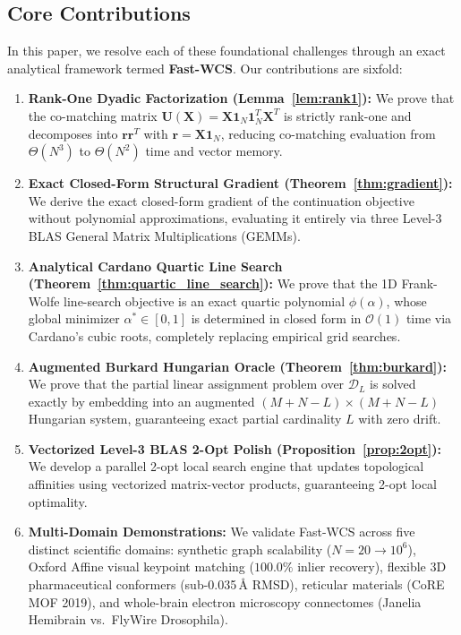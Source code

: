 \documentclass[a4paper,fleqn]{cas-dc}
\theoremstyle{thmstyleone}
\theoremstyle{thmstyletwo}
\theoremstyle{thmstylethree}
\begin{document}
\subsection{Core Contributions}
In this paper, we resolve each of these foundational challenges through an exact analytical framework termed \textbf{Fast-WCS}. Our contributions are sixfold:
\begin{enumerate}
    \item \textbf{Rank-One Dyadic Factorization (Lemma~\ref{lem:rank1}):} We prove that the co-matching matrix $\mathbf{U}(\mathbf{X}) = \mathbf{X}\mathbf{1}_N\mathbf{1}_N^T\mathbf{X}^T$ is strictly rank-one and decomposes into $\mathbf{r}\mathbf{r}^T$ with $\mathbf{r} = \mathbf{X}\mathbf{1}_N$, reducing co-matching evaluation from $\Theta(N^3)$ to $\Theta(N^2)$ time and vector memory.
    \item \textbf{Exact Closed-Form Structural Gradient (Theorem~\ref{thm:gradient}):} We derive the exact closed-form gradient of the continuation objective without polynomial approximations, evaluating it entirely via three Level-3 BLAS General Matrix Multiplications (GEMMs).
    \item \textbf{Analytical Cardano Quartic Line Search (Theorem~\ref{thm:quartic_line_search}):} We prove that the 1D Frank-Wolfe line-search objective is an exact quartic polynomial $\phi(\alpha)$, whose global minimizer $\alpha^* \in [0, 1]$ is determined in closed form in $\mathcal{O}(1)$ time via Cardano's cubic roots, completely replacing empirical grid searches.
    \item \textbf{Augmented Burkard Hungarian Oracle (Theorem~\ref{thm:burkard}):} We prove that the partial linear assignment problem over $\mathcal{D}_L$ is solved exactly by embedding into an augmented $(M+N-L) \times (M+N-L)$ Hungarian system, guaranteeing exact partial cardinality $L$ with zero drift.
    \item \textbf{Vectorized Level-3 BLAS 2-Opt Polish (Proposition~\ref{prop:2opt}):} We develop a parallel 2-opt local search engine that updates topological affinities using vectorized matrix-vector products, guaranteeing 2-opt local optimality.
    \item \textbf{Multi-Domain Demonstrations:} We validate Fast-WCS across five distinct scientific domains: synthetic graph scalability ($N = 20 \to 10^6$), Oxford Affine visual keypoint matching ($100.0\%$ inlier recovery), flexible 3D pharmaceutical conformers (sub-0.035\,\AA{} RMSD), reticular materials (CoRE MOF 2019), and whole-brain electron microscopy connectomes (Janelia Hemibrain vs.\ FlyWire Drosophila).
\end{enumerate}
\end{document}

